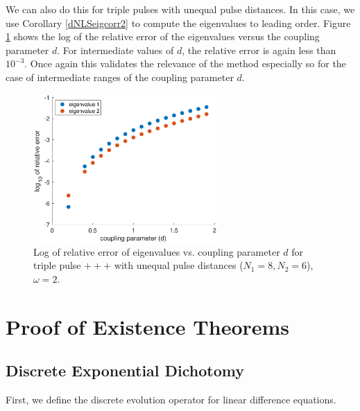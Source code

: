 \documentclass[12pt]{article}
\begin{document}
We can also do this for triple pulses with unequal pulse distances. In this case, we use Corollary \ref{dNLSeigcorr2} to compute the eigenvalues to leading order. Figure \ref{fig:error2} shows the log of the relative error of the eigenvalues versus the coupling parameter $d$.
For intermediate values of $d$, the relative error is again less than $10^{-3}$. Once again this validates the relevance
of the method especially so for the case of 
intermediate ranges of the coupling parameter $d$.

\begin{figure}[H]
\centering
\includegraphics[width=7cm]{errors3.eps}
\caption{Log of relative error of eigenvalues vs. coupling parameter $d$ for triple pulse $+++$ with unequal pulse distances ($N_1 = 8, N_2 = 6$), $\omega = 2$.}
\label{fig:error2}
\end{figure}

\section{Proof of Existence Theorems}

\subsection{Discrete Exponential Dichotomy}

First, we define the discrete evolution operator for linear difference equations.
\end{document}
